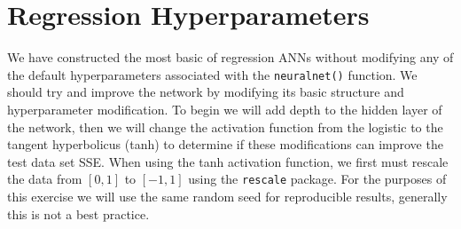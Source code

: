 \documentclass[]{book}
\begin{document}
\hypertarget{regression-hyperparameters}{%
\section{Regression Hyperparameters}\label{regression-hyperparameters}}

We have constructed the most basic of regression ANNs without modifying any of the default hyperparameters associated with the \texttt{neuralnet()} function. We should try and improve the network by modifying its basic structure and hyperparameter modification. To begin we will add depth to the hidden layer of the network, then we will change the activation function from the logistic to the tangent hyperbolicus (tanh) to determine if these modifications can improve the test data set SSE. When using the tanh activation function, we first must rescale the data from \([0,1]\) to \([-1,1]\) using the \texttt{rescale} package. For the purposes of this exercise we will use the same random seed for reproducible results, generally this is not a best practice.
\end{document}
